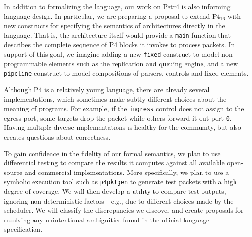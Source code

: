 \documentclass[10pt]{article}
\newcommand{\petra}{Petr4\xspace}
\begin{document}
In addition to formalizing the language, our work on \petra is also
informing language design. In particular, we are preparing a proposal
to extend P4$_{16}$ with new constructs for specifying the semantics
of architectures directly in the language. That is, the architecture
itself would provide a \texttt{main} function that describes the complete
sequence of P4 blocks it invokes to process packets. In support of
this goal, we imagine adding a new \texttt{fixed} construct to model
non-programmable elements such as the replication and queuing engine,
and a new \texttt{pipeline} construct to model compositions of parsers,
controls and fixed elements.

Although P4 is a relatively young language, there are already several
implementations, which sometimes make subtly different choices about
the meaning of programs. For example, if the \texttt{ingress} control
does not assign to the egress port, some targets drop the packet while
others forward it out port \texttt{0}. Having multiple diverse
implementations is healthy for the community, but also creates questions
about correctness.

To gain confidence in the fidelity of our formal semantics, we plan to
use differential testing to compare the results it computes against
all available open-source and commercial implementations. More
specifically, we plan to use a symbolic execution tool such
as \texttt{p4pktgen} to generate test packets with a high
degree of coverage. We will then develop a utility to compare test outputs,
ignoring non-deterministic factors---e.g., due to different choices made by
the scheduler. We will classify the discrepancies we discover and create
proposals for resolving any unintentional ambiguities found in the official
language specification.
\end{document}
